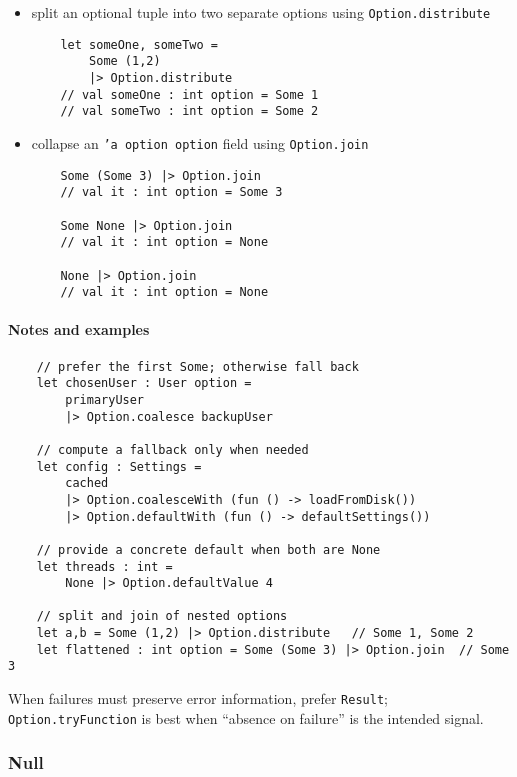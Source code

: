 \documentclass{article}
\begin{document}
\begin{itemize}
\item split an optional tuple into two separate options using \texttt{Option.distribute}
\begin{verbatim}
    let someOne, someTwo =
        Some (1,2)
        |> Option.distribute
    // val someOne : int option = Some 1
    // val someTwo : int option = Some 2
\end{verbatim}

\item collapse an \texttt{'a option option} field using \texttt{Option.join}
\begin{verbatim}
    Some (Some 3) |> Option.join
    // val it : int option = Some 3
    
    Some None |> Option.join
    // val it : int option = None
    
    None |> Option.join
    // val it : int option = None
\end{verbatim}

\end{itemize}

\paragraph{Notes and examples}
\begin{verbatim}
    // prefer the first Some; otherwise fall back
    let chosenUser : User option =
        primaryUser
        |> Option.coalesce backupUser

    // compute a fallback only when needed
    let config : Settings =
        cached
        |> Option.coalesceWith (fun () -> loadFromDisk())
        |> Option.defaultWith (fun () -> defaultSettings())

    // provide a concrete default when both are None
    let threads : int =
        None |> Option.defaultValue 4

    // split and join of nested options
    let a,b = Some (1,2) |> Option.distribute   // Some 1, Some 2
    let flattened : int option = Some (Some 3) |> Option.join  // Some 3
\end{verbatim}

\noindent When failures must preserve error information, prefer \texttt{Result}; \texttt{Option.tryFunction} is best when “absence on failure” is the intended signal.

\subsubsection{Null}
\end{document}
